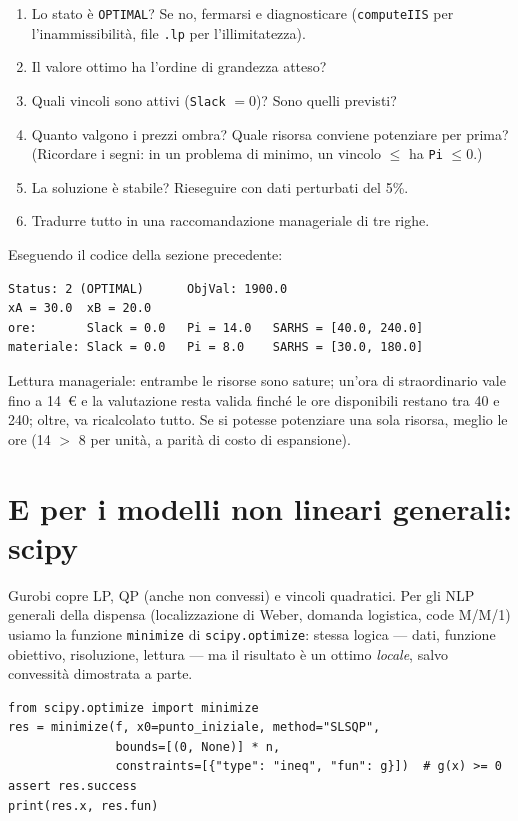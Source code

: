 \begin{enumerate}
  \item Lo stato è \texttt{OPTIMAL}? Se no, fermarsi e diagnosticare
        (\texttt{computeIIS} per l'inammissibilità, file \texttt{.lp} per l'illimitatezza).
  \item Il valore ottimo ha l'ordine di grandezza atteso?
  \item Quali vincoli sono attivi (\texttt{Slack} $=0$)? Sono quelli previsti?
  \item Quanto valgono i prezzi ombra? Quale risorsa conviene potenziare per prima?
        (Ricordare i segni: in un problema di minimo, un vincolo $\le$ ha
        \texttt{Pi} $\le 0$.)
  \item La soluzione è stabile? Rieseguire con dati perturbati del 5\%.
  \item Tradurre tutto in una raccomandazione manageriale di tre righe.
\end{enumerate}

\begin{esempio}
Eseguendo il codice della sezione precedente:
\begin{lstlisting}[style=output]
Status: 2 (OPTIMAL)      ObjVal: 1900.0
xA = 30.0  xB = 20.0
ore:       Slack = 0.0   Pi = 14.0   SARHS = [40.0, 240.0]
materiale: Slack = 0.0   Pi = 8.0    SARHS = [30.0, 180.0]
\end{lstlisting}
Lettura manageriale: entrambe le risorse sono sature; un'ora di straordinario vale fino
a 14~\euro{} e la valutazione resta valida finché le ore disponibili restano tra 40 e
240; oltre, va ricalcolato tutto. Se si potesse potenziare una sola risorsa, meglio
le ore (14 $>$ 8 per unità, a parità di costo di espansione).
\end{esempio}

\section{E per i modelli non lineari generali: scipy}

Gurobi copre LP, QP (anche non convessi) e vincoli quadratici. Per gli NLP generali
della dispensa (localizzazione di Weber, domanda logistica, code M/M/1) usiamo la
funzione \texttt{minimize} di \texttt{scipy.optimize}: stessa logica --- dati, funzione obiettivo,
risoluzione, lettura --- ma il risultato è un ottimo \emph{locale}, salvo convessità
dimostrata a parte.

\begin{lstlisting}[style=python]
from scipy.optimize import minimize
res = minimize(f, x0=punto_iniziale, method="SLSQP",
               bounds=[(0, None)] * n,
               constraints=[{"type": "ineq", "fun": g}])  # g(x) >= 0
assert res.success
print(res.x, res.fun)
\end{lstlisting}


